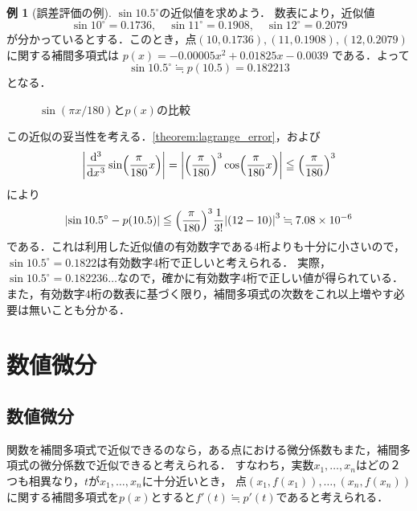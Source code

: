 \documentclass[a4paper]{ltjsarticle}
\theoremstyle{definition}
\newtheorem{example}{例}[section]
\DeclarePairedDelimiter{\abs}{\lvert}{\rvert}
\DeclarePairedDelimiter{\pqty}{\lparen}{\rparen}
\newcommand{\degree}[1]{{#1}^\circ}
\begin{document}
\begin{example}[誤差評価の例]
  $\sin \degree{10.5}$の近似値を求めよう．
  数表により，近似値
  \[
    \sin \degree{10}=0.1736,\quad \sin \degree{11}=0.1908,\quad \sin \degree{12}=0.2079
  \]
  が分かっているとする．このとき，点$(10,0.1736),(11,0.1908),(12,0.2079)$に関する補間多項式は
  $p(x) = -0.00005 x^2 + 0.01825x - 0.0039$
  である．よって
  \[
    \sin \degree{10.5} \fallingdotseq p(10.5) = 0.182213
  \]
  となる．

  \begin{figure}[H]
    \centering
    \caption{$\sin(\pi x/180)$と$p(x)$の比較}
  \end{figure}

  この近似の妥当性を考える．\cref{theorem:lagrange_error}，および
  \[
    \abs*{\diff*[3]{\sin\pqty*{\frac{\pi}{180} x}}{x}} = \abs*{\pqty*{\frac{\pi}{180}}^3\cos\pqty*{\frac{\pi}{180} x}} \leqq \pqty*{\frac{\pi}{180}}^3
  \]
  により
  \[
    \abs*{\sin \degree{10.5} - p(10.5)} \leqq \pqty*{\frac{\pi}{180}}^3 \frac{1}{3!} \abs*{(12-10)}^3 \fallingdotseq 7.08\times 10^{-6}
  \]
  である．これは利用した近似値の有効数字である$4$桁よりも十分に小さいので，$\sin \degree{10.5} =  0.1822$は有効数字$4$桁で正しいと考えられる．
  実際，$\sin \degree{10.5} = 0.182236\dots$なので，確かに有効数字$4$桁で正しい値が得られている．
  また，有効数字$4$桁の数表に基づく限り，補間多項式の次数をこれ以上増やす必要は無いことも分かる．
\end{example}

\section{数値微分}
\subsection{数値微分}
関数を補間多項式で近似できるのなら，ある点における微分係数もまた，補間多項式の微分係数で近似できると考えられる．
すなわち，実数$x_1,\dots,x_n$はどの２つも相異なり，$t$が$x_1,\dots,x_n$に十分近いとき，
点$(x_1,f(x_1)),\dots,(x_n,f(x_n))$に関する補間多項式を$p(x)$とすると$f'(t) \fallingdotseq p'(t)$であると考えられる．
\end{document}
